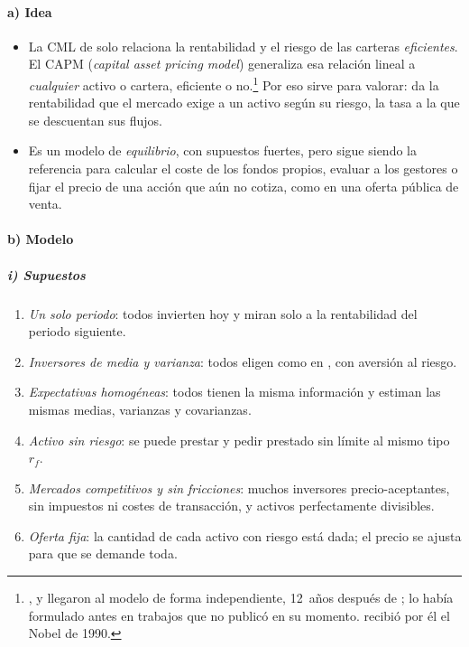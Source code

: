 \documentclass[11pt]{article}
\begin{document}
\paragraph{a) Idea}

\begin{itemize}
\item La CML de  solo relaciona la rentabilidad y el riesgo de las carteras \emph{eficientes}. El CAPM (\emph{capital asset pricing model}) generaliza esa relación lineal a \emph{cualquier} activo o cartera, eficiente o no.\footnote{\textcite{Sharpe1964Capital}, \textcite{Lintner1965Valuation} y \textcite{Mossin1966Equilibrium} llegaron al modelo de forma independiente, 12~años después de \textcite{Markowitz1952Portfolio};  lo había formulado antes en trabajos que no publicó en su momento.  recibió por él el Nobel de 1990.} Por eso sirve para valorar: da la rentabilidad que el mercado exige a un activo según su riesgo, la tasa a la que se descuentan sus flujos.
\item Es un modelo de \emph{equilibrio}, con supuestos fuertes, pero sigue siendo la referencia para calcular el coste de los fondos propios, evaluar a los gestores o fijar el precio de una acción que aún no cotiza, como en una oferta pública de venta.
\end{itemize}

\paragraph{b) Modelo}

\subparagraph{i) Supuestos}

\begin{enumerate}
\item \emph{Un solo periodo}: todos invierten hoy y miran solo a la rentabilidad del periodo siguiente.
\item \emph{Inversores de media y varianza}: todos eligen como en , con aversión al riesgo.
\item \emph{Expectativas homogéneas}: todos tienen la misma información y estiman las mismas medias, varianzas y covarianzas.
\item \emph{Activo sin riesgo}: se puede prestar y pedir prestado sin límite al mismo tipo $r_f$.
\item \emph{Mercados competitivos y sin fricciones}: muchos inversores precio-aceptantes, sin impuestos ni costes de transacción, y activos perfectamente divisibles.
\item \emph{Oferta fija}: la cantidad de cada activo con riesgo está dada; el precio se ajusta para que se demande toda.
\end{enumerate}
\end{document}
